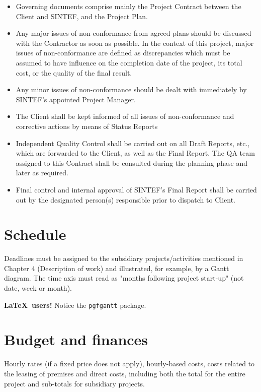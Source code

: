 \documentclass[unrestricted]{sintefprojectoffer}
\begin{document}
\begin{itemize}
  \item Governing documents comprise mainly the Project Contract between
        the Client and SINTEF, and the Project Plan.
  \item Any  major issues of non-conformance from agreed plans should be
        discussed with the Contractor as soon as possible.
        In the context of this project, major issues of non-conformance
        are defined as discrepancies which must be assumed to have influence
        on the completion date of the project, its total cost, or the
        quality of the final result.
  \item Any  minor issues of non-conformance should be dealt with immediately
        by SINTEF's appointed Project Manager.
  \item The Client shall be kept informed of all issues of non-conformance
        and corrective actions by means of Status Reports
  \item Independent Quality Control shall be carried out on all Draft Reports,
        etc., which are forwarded to the Client, as well as the Final Report.
        The QA team assigned to this Contract shall be consulted during the
        planning phase and later as required.
  \item Final control and internal approval of SINTEF's Final Report shall be
        carried out by the designated person(s) responsible prior to dispatch
        to Client.
\end{itemize}

\section{Schedule}
Deadlines must be assigned to the subsidiary projects/activities mentioned in
Chapter 4 (Description of work) and illustrated, for example, by a Gantt diagram.
The time axis must read as "months following project start-up" (not date, week or month).

\textbf{\LaTeX\ users!} Notice the \texttt{pgfgantt} package.

\section{Budget and finances}
Hourly rates (if a fixed price does not apply), hourly-based costs, costs related to
the leasing of premises and direct costs, including both the total for the entire
project and sub-totals for subsidiary projects.
\end{document}
